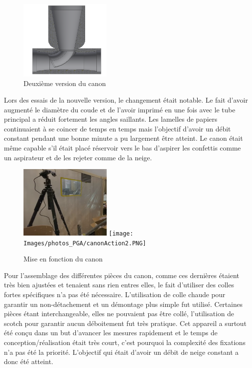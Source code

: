 \begin{figure}[H]
    \centering
    \includegraphics[width=0.4\textwidth]{Images/photos_PGA/venturi_v2.PNG}
    \caption{Deuxième version du canon}
    \label{fig:venturiv2}
\end{figure}

Lors des essais de la nouvelle version, le changement était notable. Le fait d’avoir augmenté le diamètre 
du coude et de l’avoir imprimé en une fois avec le tube principal a réduit fortement les angles saillants. 
Les lamelles de papiers continuaient à se coincer de temps en temps mais l’objectif d’avoir un débit 
constant pendant une bonne minute a pu largement être atteint. Le canon était même capable s’il était 
placé réservoir vers le bas d’aspirer les confettis comme un aspirateur et de les rejeter comme de la 
neige. 

\begin{figure}[H]
    \centering
    \includegraphics[width=0.4\textwidth]{Images/photos_PGA/canonAction1.PNG}
    \texttt{[image: Images/photos\_PGA/canonAction2.PNG]}
    \caption{Mise en fonction du canon}
    \label{fig:canonupdate}
\end{figure}

Pour l’assemblage des différentes pièces du canon, comme ces dernières étaient très bien ajustées et 
tenaient sans rien entres elles, le fait d’utiliser des colles fortes spécifiques n’a pas été nécessaire. 
L’utilisation de colle chaude pour garantir un non-détachement et un démontage plus simple fut utilisé. 
Certaines pièces étant interchangeable, elles ne pouvaient pas être collé, l’utilisation de scotch pour 
garantir aucun déboitement fut très pratique. Cet appareil a surtout été conçu dans un but d’avancer 
les mesures rapidement et le temps de conception/réalisation était très court, c’est pourquoi la complexité 
des fixations n’a pas été la priorité. L’objectif qui était d’avoir un débit de neige constant a donc 
été atteint.

